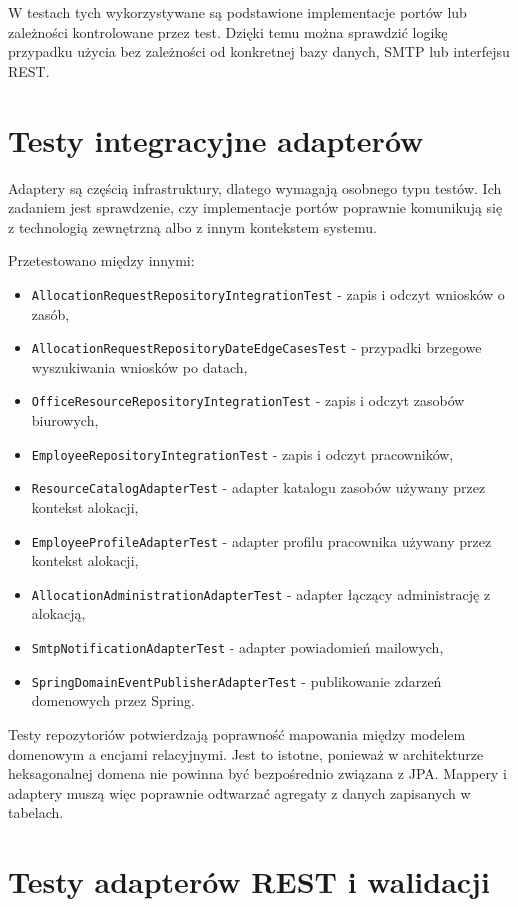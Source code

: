 W testach tych wykorzystywane są podstawione implementacje portów lub zależności kontrolowane przez test. Dzięki temu można sprawdzić logikę przypadku użycia bez zależności od konkretnej bazy danych, SMTP lub interfejsu REST.

\section{Testy integracyjne adapterów}

Adaptery są częścią infrastruktury, dlatego wymagają osobnego typu testów. Ich zadaniem jest sprawdzenie, czy implementacje portów poprawnie komunikują się z technologią zewnętrzną albo z innym kontekstem systemu.

Przetestowano między innymi:
\begin{itemize}
    \item \texttt{AllocationRequestRepositoryIntegrationTest} - zapis i odczyt wniosków o zasób,
    \item \texttt{AllocationRequestRepositoryDateEdgeCasesTest} - przypadki brzegowe wyszukiwania wniosków po datach,
    \item \texttt{OfficeResourceRepositoryIntegrationTest} - zapis i odczyt zasobów biurowych,
    \item \texttt{EmployeeRepositoryIntegrationTest} - zapis i odczyt pracowników,
    \item \texttt{ResourceCatalogAdapterTest} - adapter katalogu zasobów używany przez kontekst alokacji,
    \item \texttt{EmployeeProfileAdapterTest} - adapter profilu pracownika używany przez kontekst alokacji,
    \item \texttt{AllocationAdministrationAdapterTest} - adapter łączący administrację z alokacją,
    \item \texttt{SmtpNotificationAdapterTest} - adapter powiadomień mailowych,
    \item \texttt{SpringDomainEventPublisherAdapterTest} - publikowanie zdarzeń domenowych przez Spring.
\end{itemize}

Testy repozytoriów potwierdzają poprawność mapowania między modelem domenowym a encjami relacyjnymi. Jest to istotne, ponieważ w architekturze heksagonalnej domena nie powinna być bezpośrednio związana z JPA. Mappery i adaptery muszą więc poprawnie odtwarzać agregaty z danych zapisanych w tabelach.

\section{Testy adapterów REST i walidacji}

